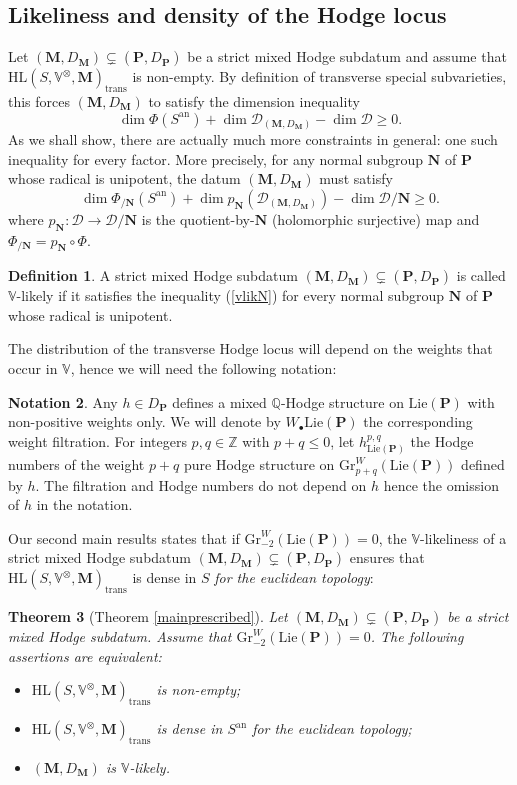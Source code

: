 \documentclass[10pt]{article}
\numberwithin{equation}{subsection}
\theoremstyle{plain}
\newtheorem{theorem}{Theorem}[section]
\theoremstyle{definition}
\newtheorem{definition}[theorem]{Definition}
\newtheorem{notation}[theorem]{Notation}
\theoremstyle{remark}
\newcommand{\lie}{\mathrm{Lie}}
\newcommand{\Z}{\mathbb Z}
\newcommand{\Q}{\mathbb Q}
\newcommand{\V}{\mathbb V}
\newcommand{\pp}{\mathbf P}
\newcommand{\M}{\mathbf M}
\newcommand{\NN}{\mathbf N}
\newcommand{\HLM}{\mathrm{HL}(S, \V^\otimes, \M)}
\newcommand{\bul}{\bullet}
\newcommand{\an}{\mathrm{an}}
\newcommand{\gr}{\mathrm{Gr}}
\newcommand{\period}{\mathscr{D}}
\newcommand{\trans}{\mathrm{trans}}
\begin{document}
\subsection*{Likeliness and density of the Hodge locus}
Let $(\M, D_\M) \subsetneq (\pp, D_\pp)$ be a strict mixed Hodge subdatum and assume that $\HLM_\trans$ is non-empty. By definition of transverse special subvarieties, this forces $(\M,D_\M)$ to satisfy the dimension inequality
\[
\dim \Phi(S^\an) + \dim \period_{(\M,D_\M)} - \dim \period \geqslant 0.
\]
As we shall show, there are actually much more constraints in general: one such inequality for every factor. More precisely, for any normal subgroup $\NN$ of $\pp$ whose radical is unipotent, the datum $(\M,D_\M)$ must satisfy
\begin{equation}
\tag{$\ast_\NN$}
\dim \Phi_{/\NN}(S^\an) + \dim p_\NN(\period_{(\M, D_\M)}) - \dim \period/\NN \geqslant 0.
\label{vlikN}
\end{equation}
where $p_\NN : \period \rightarrow \period/\NN$ is the quotient-by-$\NN$ (holomorphic surjective) map and $\Phi_{/\NN} = p_\NN \circ \Phi$.
\begin{definition}
A strict mixed Hodge subdatum $(\M, D_\M) \subsetneq (\pp, D_\pp)$ is called $\V$-likely if it satisfies the inequality (\ref{vlikN}) for every normal subgroup $\NN$ of $\pp$ whose radical is unipotent.
\end{definition}
The distribution of the transverse Hodge locus will depend on the weights that occur in $\V$, hence we will need the following notation:
\begin{notation}
Any $h \in D_\pp$ defines a mixed $\Q$-Hodge structure on $\lie(\pp)$ with non-positive weights only. We will denote by $W_\bul \lie(\pp)$ the corresponding weight filtration. For integers $p,q \in \Z$ with $p+q \leqslant 0$, let $h_{\lie(\pp)}^{p,q}$ the Hodge numbers of the weight $p+q$ pure Hodge structure on $\gr^W_{p+q}(\lie(\pp))$ defined by $h$. The filtration and Hodge numbers do not depend on $h$ hence the omission of $h$ in the notation. 
\end{notation}
Our second main results states that if $\gr^W_{-2}(\lie(\pp)) = 0$, the $\V$-likeliness of a strict mixed Hodge subdatum $(\M, D_\M) \subsetneq (\pp, D_\pp)$ ensures that $\HLM_\trans$ is dense in $S$ \textit{for the euclidean topology}:
\begin{theorem}[Theorem \ref{mainprescribed}]\label{thm1}
Let $(\M, D_\M) \subsetneq (\pp, D_\pp)$ be a strict mixed Hodge subdatum. Assume that $\gr^W_{-2}(\lie(\pp)) = 0$. The following assertions are equivalent:
\begin{itemize}
\item[(i)] $\HLM_\trans$ is non-empty;
\item[(ii)]$\HLM_\trans$ is dense in $S^\an$ for the euclidean topology;
\item[(iii)]$(\M, D_\M)$ is $\V$-likely.
\end{itemize}
\end{theorem}
\end{document}
